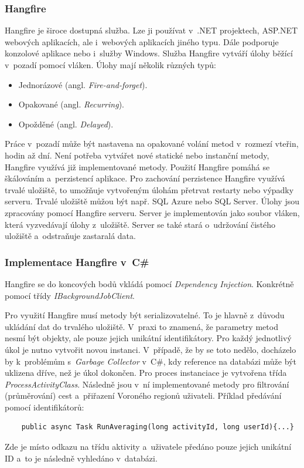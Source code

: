 \subsubsection{Hangfire}
Hangfire je široce dostupná služba. Lze ji používat v~.NET projektech, ASP.NET webových aplikacích, ale i~webových aplikacích jiného typu. Dále podporuje konzolové aplikace nebo i~služby Windows. Služba Hangfire vytváří úlohy běžící v~pozadí pomocí vláken. Úlohy mají několik různých typů:
\begin{itemize}
    \item Jednorázové (angl. \emph{Fire-and-forget}).
    \item Opakované (angl. \emph{Recurring}).
    \item Opožděné (angl. \emph{Delayed}).
\end{itemize}
Práce v~pozadí může být nastavena na opakované volání metod v~rozmezí vteřin, hodin až dní. Není potřeba vytvářet nové statické nebo instanční metody, Hangfire využívá již implementované metody. Použití Hangfire pomáhá se škálováním a~perzistencí aplikace. Pro zachování perzistence Hangfire využívá trvalé uložiště, to umožňuje vytvořeným úlohám přetrvat restarty nebo výpadky serveru. Trvalé uložiště můžou být např. SQL Azure nebo SQL Server. Úlohy jsou zpracovány pomocí Hangfire serveru. Server je implementován jako soubor vláken, která vyzvedávají úlohy z~uložiště. Server se také stará o~udržování čistého uložiště a~odstraňuje zastaralá data. \cite{Hangfire}

\subsubsection{Implementace Hangfire v~C\#}
Hangfire se do koncových bodů vkládá pomocí \emph{Dependency Injection}. Konkrétně pomocí třídy \emph{IBackgroundJobClient}.
    
\noindent Pro využití Hangfire musí metody být serializovatelné. To je hlavně z~důvodu ukládání dat do trvalého uložiště. V~praxi to znamená, že parametry metod nesmí být objekty, ale pouze jejich unikátní identifikátory. Pro každý jednotlivý úkol je nutno vytvořit novou instanci. V~případě, že by se toto nedělo, docházelo by k~problémům s~\emph{Garbage Collector} v~C\#, kdy reference na databázi může být uklizena dříve, než je úkol dokončen.
Pro proces instanciace je vytvořena třída \emph{ProcessActivityClass}. Následně jsou v~ní implementované metody pro filtrování (průměrování) cest a~přiřazení Voroného regionů uživateli. 
Příklad předávání pomocí identifikátorů: 
\begin{verbatim}
    public async Task RunAveraging(long activityId, long userId){...}
\end{verbatim}
Zde je místo odkazu na třídu aktivity a~uživatele předáno pouze jejich unikátní ID a~to je následně vyhledáno v~databázi.
